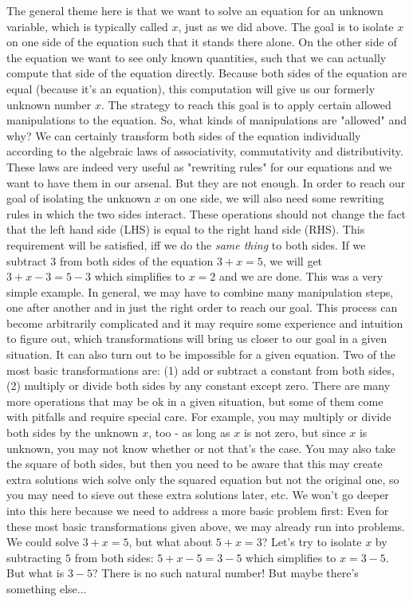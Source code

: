\medskip
The general theme here is that we want to solve an equation for an unknown variable, which is typically called $x$, just as we did above. The goal is to isolate $x$ on one side of the equation such that it stands there alone. On the other side of the equation we want to see only known quantities, such that we can actually compute that side of the equation directly. Because both sides of the equation are equal (because it's an equation), this computation will give us our formerly unknown number $x$. The strategy to reach this goal is to apply certain allowed manipulations to the equation. So, what kinds of manipulations are "allowed" and why?  We can certainly transform both sides of the equation individually according to the algebraic laws of associativity, commutativity and distributivity. These laws are indeed very useful as "rewriting rules" for our equations and we want to have them in our arsenal. But they are not enough. In order to reach our goal of isolating the unknown $x$ on one side, we will also need some rewriting rules in which the two sides interact. These operations should not change the fact that the left hand side (LHS) is equal to the right hand side (RHS). This requirement will be satisfied, iff we do the \emph{same thing} to both sides. If we subtract $3$ from both sides of the equation $3 + x = 5$, we will get $3 + x - 3 = 5 - 3$ which simplifies to $x = 2$ and we are done. This was a very simple example. In general, we may have to combine many manipulation steps, one after another and in just the right order to reach our goal. This process can become arbitrarily complicated  and it may require some experience and intuition to figure out, which transformations will bring us closer to our goal in a given situation. It can also turn out to be impossible for a given equation. Two of the most basic transformations are: (1) add or subtract a constant from both sides, (2) multiply or divide both sides by any constant except zero. There are many more operations that may be ok in a given situation, but some of them come with pitfalls and require special care. For example, you may multiply or divide both sides by the unknown $x$, too - as long as $x$ is not zero, but since $x$ is unknown, you may not know whether or not that's the case. You may also take the square of both sides, but then you need to be aware that this may create extra solutions wich solve only the squared equation but not the original one, so you may need to sieve out these extra solutions later, etc. We won't go deeper into this here because we need to address a more basic problem first: Even for these most basic transformations given above, we may already run into problems. We could solve $3 + x = 5$, but what about $5 + x = 3$? Let's try to isolate $x$ by subtracting $5$ from both sides: $5 + x - 5 = 3 - 5$ which simplifies to $x = 3 - 5$. But what is $3-5$? There is no such natural number! But maybe there's something else...

